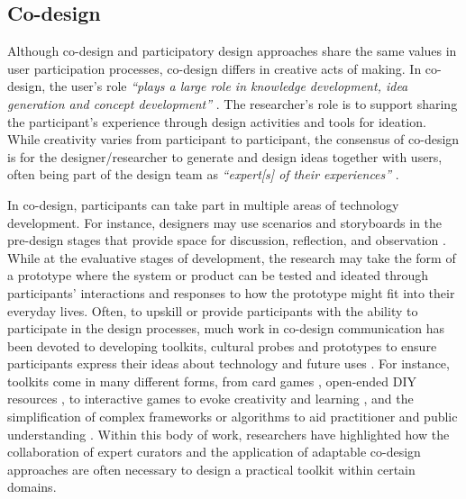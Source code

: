\subsection{Co-design}
\label{co-design}
Although co-design and participatory design approaches share the same values in user participation processes, co-design differs in creative acts of making. In co-design, the user's role \textit{``plays a large role in knowledge development, idea generation and concept development''} \citep{sanders2008co}. The researcher's role is to support sharing the participant's experience through design activities and tools for ideation. While creativity varies from participant to participant, the consensus of co-design is for the designer/researcher to generate and design ideas together with users, often being part of the design team as \textit{``expert[s] of their experiences''} \citep{visser2005contextmapping}.   

In co-design, participants can take part in multiple areas of technology development. For instance, designers may use scenarios and storyboards in the pre-design stages that provide space for discussion, reflection, and observation \citep{bell2019collaborative}. While at the evaluative stages of development, the research may take the form of a prototype where the system or product can be tested and ideated through participants' interactions and responses to how the prototype might fit into their everyday lives. Often, to upskill or provide participants with the ability to participate in the design processes, much work in co-design communication has been devoted to developing toolkits, cultural probes and prototypes to ensure participants express their ideas about technology and future uses \citep{medina_angarita_what_2020}. For instance, toolkits come in many different forms, from card games \citep{logler2018metaphor}, open-ended DIY resources \citep{meissner2018schnittmuster}, to interactive games to evoke creativity and learning \citep{ellis2021tapeblocks}, and the simplification of complex frameworks or algorithms to aid practitioner and public understanding \citep{krafft2021action}. Within this body of work, researchers have highlighted how the collaboration of expert curators and the application of adaptable co-design approaches are often necessary to design a practical toolkit within certain domains. 

